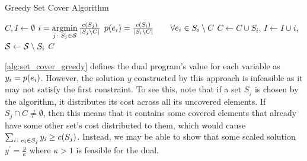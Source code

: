 \begin{algorithm}[!h]
    \caption{Greedy Set Cover Algorithm} \label{alg:set_cover_greedy}
    \begin{algorithmic}[1]
        \State $C, I \gets \emptyset$
            \State $i = \argmin_{j\colon S_j \in \calS} \frac{c(S_j)}{\abs{S_j \sm C}}$
            \State $\f[p]{e_i} = \frac{c(S_i)}{\abs{S_i \sm C}} \quad \quad \forall e_i \in S_i \sm C$
            \State $C \gets C \cup S_i$, $I \gets I \cup i$, $\calS \gets \calS \sm S_i$
        \EndWhile
        \State \Return $C$
    \end{algorithmic}
\end{algorithm}

\cref{alg:set_cover_greedy} defines the dual program's value for each variable as $y_i = \f[p]{e_i}$. 
However, the solution $y$ constructed by this approach is infeasible as it may not satisfy the first constraint. 
To see this, note that if a set $S_j$ is chosen by the algorithm, it distributes its cost across all its uncovered elements. 
If $S_j \cap C \neq \emptyset$, then this means that it contains some covered elements that already have some other set's cost distributed to them, 
which would cause $\sum_{i\colon e_i\in S_j} y_i \geq \f[c]{S_j}$. Instead, we may be able to show that some scaled solution $y^\prime = \frac{y}{\kappa}$
where $\kappa > 1$ is feasible for the dual. 

